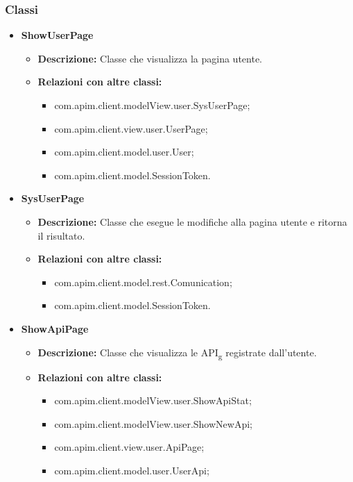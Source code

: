 {{		\subsubsection{Classi}{
			\begin{itemize}
				\item \textbf{ShowUserPage}
					\begin{itemize}
						\item \textbf{Descrizione:} Classe che visualizza la pagina utente.
						\item \textbf{Relazioni con altre classi:}
						\begin{itemize}
							\item com.apim.client.modelView.user.SysUserPage;
							\item com.apim.client.view.user.UserPage;
							\item com.apim.client.model.user.User;
							\item com.apim.client.model.SessionToken.
						\end{itemize}
					\end{itemize}
				\item \textbf{SysUserPage}
					\begin{itemize}
						\item \textbf{Descrizione:} Classe che esegue le modifiche alla pagina utente e ritorna il risultato.
						\item \textbf{Relazioni con altre classi:}
						\begin{itemize}
							\item com.apim.client.model.rest.Comunication;
							\item com.apim.client.model.SessionToken.
						\end{itemize}
					\end{itemize}
				\item \textbf{ShowApiPage}
					\begin{itemize}
						\item \textbf{Descrizione:} Classe che visualizza le API\textsubscript{g} registrate dall'utente.
						\item \textbf{Relazioni con altre classi:}
						\begin{itemize}
							\item com.apim.client.modelView.user.ShowApiStat;
							\item com.apim.client.modelView.user.ShowNewApi;
							\item com.apim.client.view.user.ApiPage;
							\item com.apim.client.model.user.UserApi;

\end{itemize}
\end{itemize}
\end{itemize}}}}
